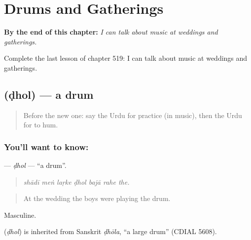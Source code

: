 
\chapter{Drums and Gatherings}
\label{ch:ur-drums-and-gatherings}

\begin{chapteropening}
\textbf{By the end of this chapter:} \emph{I can talk about music at weddings and gatherings.}

Complete the last lesson of chapter 519: I can talk about music at weddings and gatherings.
\end{chapteropening}

\section[\texorpdfstring{\ur{ڈھول} (ḍhol)}{ڈھول (ḍhol)}]{ (ḍhol) — a drum}

\label{lesson:UR-C519-dhol}



\begin{quote}
Before the new one: say the Urdu for practice (in music), then the Urdu for to hum.
\end{quote}

\subsection*{You'll want to know: }
\textbf{} — \emph{ḍhol} — \textquotedblleft{}a drum\textquotedblright{}.

\begin{quote}
      
\end{quote}

\begin{quote}
\emph{shādī meṅ laṛke ḍhol bajā rahe the.}
\end{quote}

\begin{quote}
At the wedding the boys were playing the drum.
\end{quote}

Masculine.

\begin{cousinweb}
\textbf{} (\emph{ḍhol}) is inherited from Sanskrit \emph{ḍhōla}, \textquotedblleft{}a large drum\textquotedblright{} (CDIAL 5608).
\end{cousinweb}

